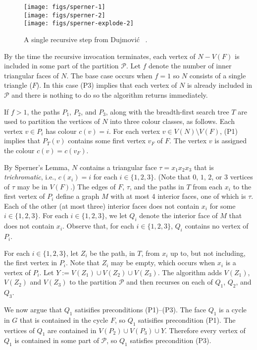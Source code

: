 \documentclass[kpfonts]{patmorin}
\begin{document}
\begin{figure}
  \begin{center}
    \texttt{[image: figs/sperner-1]} \\[1ex]
    \texttt{[image: figs/sperner-2]} \\[1ex]
    \texttt{[image: figs/sperner-explode-2]}
  \end{center}
  \caption{A single recursive step from Dujmović \etal\  \cite{dujmovic.joret.ea:planar}.}
\end{figure}

By the time the recursive invocation terminates, each vertex of $N-V(F)$ is included in some part of the partition $\mathcal{P}$. Let $f$ denote the number of inner triangular faces of $N$.  The base case occurs when $f=1$ so $N$ consists of a single triangle ($F$).  In this case (P3) implies that each vertex of $N$ is already included in $\mathcal{P}$ and there is nothing to do so the algorithm returns immediately.

If $f>1$, the paths $P_1$, $P_2$, and $P_3$, along with the breadth-first search tree $T$ are used to partition the vertices of $N$ into three colour classes, as follows.  Each vertex $v\in P_i$ has colour $c(v)=i$.  For each vertex $v\in V(N)\setminus V(F)$, (P1) implies that $P_T(v)$ contains some first vertex $v_F$ of $F$.  The vertex $v$ is assigned the colour $c(v)=c(v_F)$.

By Sperner's Lemma, $N$ contains a triangular face $\tau=x_1x_2x_3$ that is \emph{trichromatic}, i.e., $c(x_i)=i$ for each $i\in\{1,2,3\}$. (Note that $0$, $1$, $2$, or $3$ vertices of $\tau$ may be in $V(F)$.)  The edges of $F$, $\tau$, and the paths in $T$ from each $x_i$ to the first vertex of $P_i$ define a graph $M$ with at most 4 interior faces, one of which is $\tau$.  Each of the other (at most three) interior faces does not contain $x_i$ for some $i\in\{1,2,3\}$. For each $i\in\{1,2,3\}$, we let $Q_i$ denote the interior face of $M$ that does not contain $x_i$. Observe that, for each $i\in\{1,2,3\}$, $Q_i$ contains no vertex of $P_i$.

For each $i\in\{1,2,3\}$, let $Z_i$ be the path, in $T$, from $x_i$ up to, but not including, the first vertex in $P_i$.  Note that $Z_i$ may be empty, which occurs when $x_i$ is a vertex of $P_i$.  Let $Y:=V(Z_1)\cup V(Z_2)\cup V(Z_3)$.  The algorithm adds $V(Z_1)$, $V(Z_2)$ and $V(Z_3)$ to the partition $\mathcal{P}$ and then recurses on each of $Q_1$, $Q_2$, and $Q_3$.

We now argue that $Q_1$ satisifies preconditions (P1)--(P3). The face $Q_1$ is a cycle in $G$ that is contained in the cycle $F$, so $Q_1$ satisifies precondition (P1).  The vertices of $Q_1$ are contained in $V(P_2)\cup V(P_3)\cup Y$.  Therefore every vertex of $Q_1$ is contained in some part of $\mathcal{P}$, so $Q_1$ satisfies precondition (P3).
\end{document}
